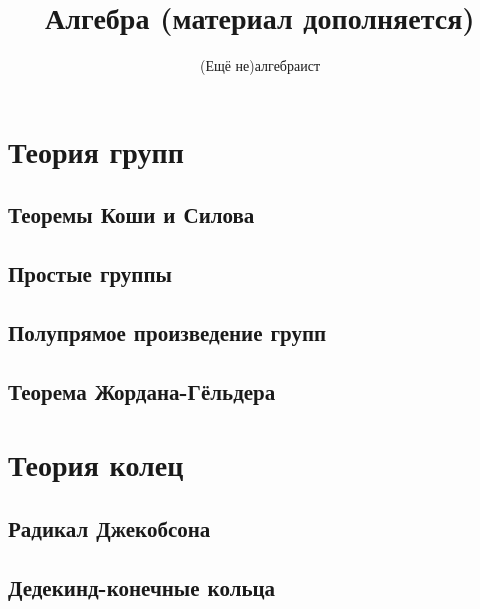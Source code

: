 \documentclass[12pt]{amsart}
\title{Алгебра (материал дополняется)}
\author{(Ещё не)алгебраист}
\numberwithin{theorem}{subsection}
\theoremstyle{definition}
\begin{document}
\maketitle

\tableofcontents

\newpage
\section{Теория групп}

\subsection{Теоремы Коши и Силова}



\subsection{Простые группы}



\subsection{Полупрямое произведение групп}



\subsection{Теорема Жордана-Гёльдера}



\newpage

\section{Теория колец}

\subsection{Радикал Джекобсона}



\subsection{Дедекинд-конечные кольца}


\end{document}
